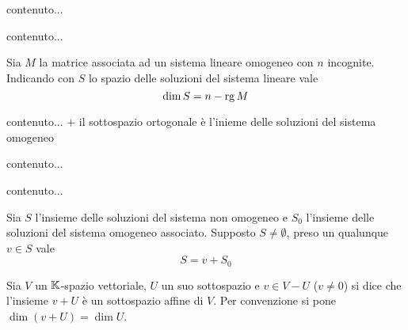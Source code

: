 
\begin{definition}
	contenuto...
\end{definition}

\begin{definition}
	contenuto...
\end{definition}

\begin{thm}
	Sia $ M $ la matrice associata ad un sistema lineare omogeneo con $ n $ incognite. Indicando con $ S $ lo spazio delle soluzioni del sistema lineare vale \[\dim{S} = n - \operatorname{rg}{M}\]
\end{thm}

\begin{definition}
	contenuto... + \textsf{il sottospazio ortogonale è l'inieme delle soluzioni del sistema omogeneo}
\end{definition}

\begin{definition}
	contenuto...
\end{definition}

\begin{definition}
	contenuto...
\end{definition}

\begin{thm}
	Sia $ S $ l'insieme delle soluzioni del sistema non omogeneo e $ S_0 $ l'insieme delle soluzioni del sistema omogeneo associato. Supposto $ S \neq \emptyset $, preso un qualunque $ v \in S $ vale \[S = v + S_0\]
\end{thm}

\begin{definition}
	Sia $ V $ un $ \mathbb{K} $-spazio vettoriale, $ U $ un suo sottospazio e $ v \in V - U $ ($ v \neq 0 $) si dice che l'insieme $ v + U $ è un sottospazio affine di $ V $. Per convenzione si pone $ \dim{(v + U)} = \dim{U} $.
\end{definition}